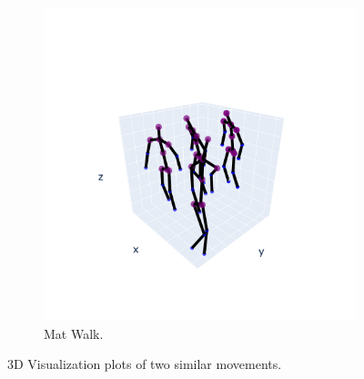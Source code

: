 \begin{figure}[h]
\begin{subfigure}{.5\textwidth}
                  \includegraphics[width=1.\linewidth]{../src/resources/plots/movements/mov-8.png}
                  \caption{Mat Walk.}
                  \label{fig: mat-walk}
                \end{subfigure}
                \caption{3D Visualization plots of two similar movements.}
            \end{figure}

\cleardoublepage
